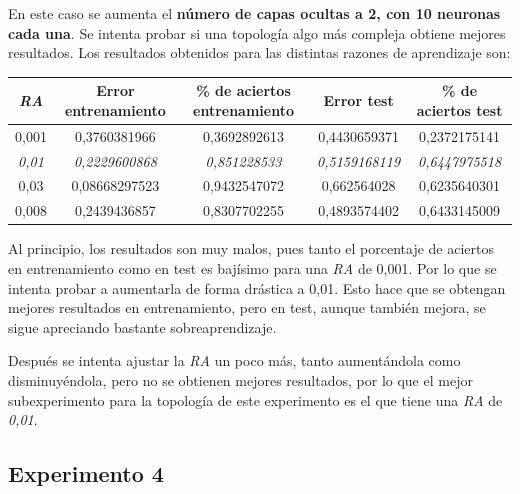 \documentclass{uc3mpracticas}
\begin{document}
En este caso se aumenta el \textbf{número de capas ocultas a 2, con 10 neuronas cada una}. Se intenta probar si una topología algo más compleja obtiene mejores resultados. Los resultados obtenidos para las distintas razones de aprendizaje son:

\begin{center}
  \begin{tabular}{|c|c|c|c|c|}
    \hline
    \rowcolor{Gray}
        \textit{\textbf{RA}}  & \textbf{Error entrenamiento} & \textbf{\% de aciertos entrenamiento} & \textbf{Error test} & \textbf{\% de aciertos test}\\ \hline
        0,001                 &  0,3760381966                &  0,3692892613                         &  0,4430659371       &  0,2372175141               \\ \hline
        \rowcolor{LightGreen}
        \textit{0,01}         &  \textit{0,2229600868}       &  \textit{0,851228533}                 &  \textit{0,5159168119}&  \textit{0,6447975518}    \\ \hline
        0,03                  &  0,08668297523               &  0,9432547072                         &  0,662564028        &  0,6235640301               \\ \hline
        0,008                 &  0,2439436857                &  0,8307702255                         &  0,4893574402       &  0,6433145009               \\ \hline

  \end{tabular}
\end{center}

Al principio, los resultados son muy malos, pues tanto el porcentaje de aciertos en entrenamiento como en test es bajísimo para una \textit{RA} de 0,001. Por lo que se intenta probar a aumentarla de forma drástica a 0,01. Esto hace que se obtengan mejores resultados en entrenamiento, pero en test, aunque también mejora, se sigue apreciando bastante sobreaprendizaje.

\vspace{2mm}

Después se intenta ajustar la \textit{RA} un poco más, tanto aumentándola como disminuyéndola, pero no se obtienen mejores resultados, por lo que el mejor subexperimento para la topología de este experimento es el que tiene una \textit{RA} de \textit{0,01}.


\subsection{Experimento 4}
\end{document}
